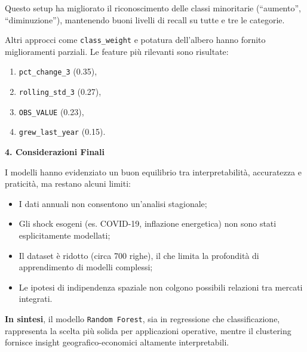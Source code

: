 \documentclass[conference]{IEEEtran}
\begin{document}
Questo setup ha migliorato il riconoscimento delle classi minoritarie (“aumento”, “diminuzione”), mantenendo buoni livelli di recall su tutte e tre le categorie.

Altri approcci come \texttt{class\_weight} e potatura dell’albero hanno fornito miglioramenti parziali. Le feature più rilevanti sono risultate:

\begin{enumerate}
  \item \texttt{pct\_change\_3} (0.35),
  \item \texttt{rolling\_std\_3} (0.27),
  \item \texttt{OBS\_VALUE} (0.23),
  \item \texttt{grew\_last\_year} (0.15).
\end{enumerate}

\vspace{1em}\noindent\textbf{4. Considerazioni Finali}

I modelli hanno evidenziato un buon equilibrio tra interpretabilità, accuratezza e praticità, ma restano alcuni limiti:

\begin{itemize}
  \item I dati annuali non consentono un’analisi stagionale;
  \item Gli shock esogeni (es. COVID-19, inflazione energetica) non sono stati esplicitamente modellati;
  \item Il dataset è ridotto (circa 700 righe), il che limita la profondità di apprendimento di modelli complessi;
  \item Le ipotesi di indipendenza spaziale non colgono possibili relazioni tra mercati integrati.
\end{itemize}

\textbf{In sintesi}, il modello \texttt{Random Forest}, sia in regressione che classificazione, rappresenta la scelta più solida per applicazioni operative, mentre il clustering fornisce insight geografico-economici altamente interpretabili.
\end{document}
